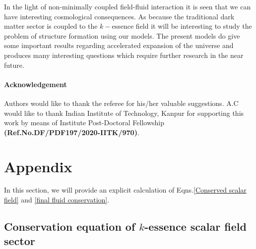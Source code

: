 \documentclass[a4paper,12pt]{article}
\begin{document}
In the light of non-minimally coupled field-fluid interaction it is seen that we can have interesting cosmological consequences.  As because the traditional dark matter sector is coupled to the $k-$essence field it will be interesting to study the problem of structure formation using our models. The present models do give some important results regarding accelerated expansion of the universe and produces many interesting questions which require further research in the near future. 


\paragraph{Acknowledgement}
Authors would like to thank the referee for his/her valuable suggestions. A.C would like to thank Indian Institute of Technology, Kanpur for supporting this work by means of Institute Post-Doctoral Fellowship \textbf{(Ref.No.DF/PDF197/2020-IITK/970)}.


\section{Appendix}
\label{sec:6}
In this section, we will provide an explicit calculation of Eqns.\eqref{Conserved scalar field} and \eqref{final fluid conservation}.
\subsection{Conservation equation of $k$-essence scalar field sector}
\end{document}
